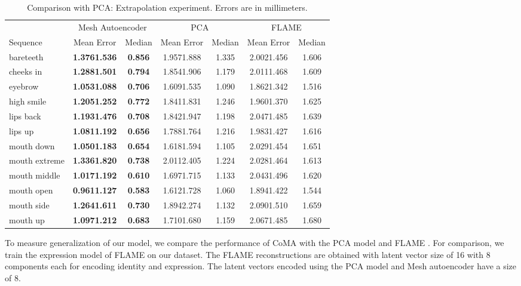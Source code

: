 \begin{table}[t]
\begin{center}
\caption{Comparison with PCA: Extrapolation experiment. Errors are in millimeters.}
\begin{tabular}{l|cc|cc|cc}
&  \multicolumn{2}{|c}{Mesh Autoencoder} & \multicolumn{2}{|c}{PCA} & \multicolumn{2}{|c}{FLAME \cite{FLAME2017}} \\
Sequence   &  Mean Error & Median & Mean Error & Median & Mean Error & Median \\ \hline
bareteeth & \textbf{1.3761.536} & \textbf{0.856}  &1.9571.888 & 1.335 & 2.0021.456 & 1.606 \\
cheeks in & \textbf{1.2881.501} & \textbf{0.794}  &1.8541.906 & 1.179 & 2.0111.468 & 1.609 \\
eyebrow &  \textbf{1.0531.088} & \textbf{0.706} &1.6091.535 & 1.090 & 1.8621.342 & 1.516 \\
high smile & \textbf{1.2051.252} & \textbf{0.772} & 1.8411.831 & 1.246 & 1.9601.370 & 1.625 \\
lips back & \textbf{1.1931.476} & \textbf{0.708} & 1.8421.947 & 1.198 & 2.0471.485 & 1.639 \\
lips up & \textbf{1.0811.192} & \textbf{0.656} & 1.7881.764 & 1.216 & 1.9831.427 & 1.616 \\
mouth down & \textbf{1.0501.183} & \textbf{0.654} & 1.6181.594 & 1.105 & 2.0291.454 & 1.651 \\
mouth extreme &\textbf{1.3361.820} & \textbf{0.738}  & 2.0112.405 & 1.224 & 2.0281.464 & 1.613 \\
mouth middle & \textbf{1.0171.192} & \textbf{0.610}  &1.6971.715 & 1.133 & 2.0431.496 & 1.620 \\
mouth open & \textbf{0.9611.127} & \textbf{0.583}  &1.6121.728 & 1.060 & 1.8941.422 & 1.544 \\
mouth side &  \textbf{1.2641.611} & \textbf{0.730}  &1.8942.274 & 1.132& 2.0901.510 & 1.659 \\
mouth up & \textbf{1.0971.212} & \textbf{0.683}  &1.7101.680 & 1.159 & 2.0671.485 & 1.680
\end{tabular}
\vspace{-4mm}
\label{tab:extrap}
\end{center}
\end{table}

 To measure generalization of our model, we compare the performance of CoMA with the PCA model and FLAME \cite{FLAME2017}. For comparison, we train the expression model of FLAME on our dataset. The FLAME reconstructions are obtained with latent vector size of 16 with 8 components each for encoding identity and expression. The latent vectors encoded using the PCA model and Mesh autoencoder have a size of 8.

